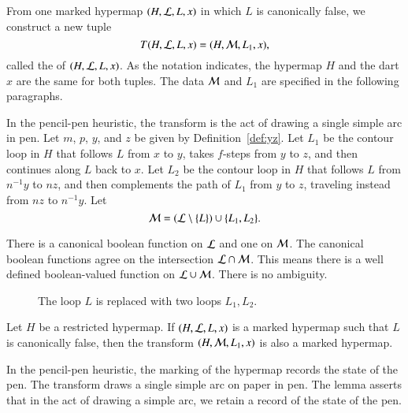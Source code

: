 \begin{definition}[transform]
  From one marked hypermap $(H,{\cal L},L,x)$ in which $L$ is
  canonically false, we construct a new tuple
\[ 
T(H,{\cal L},L,x) = (H,{\cal M},L_1,x),
\] 
 called the  of
  $(H,{\cal{L}},L,x)$.  
As the notation indicates, the hypermap $H$ and the dart $x$ are the same for both
tuples.  The data ${\cal M}$ and $L_1$ are specified in
the following paragraphs.
\end{definition}

In the pencil-pen heuristic, the transform is the act of drawing a single simple arc in
pen.
Let $m$, $p$, $y$, and $z$ be  given by
Definition~\ref{def:yz}.
Let $L_1$ be 
the contour loop in $H$ that follows $L$ from $x$ to $y$,  takes
$f$-steps from $y$ to $z$, and then continues along $L$ back to $x$.  
Let $L_2$ be
the contour loop in $H$ that follows $L$ from $n^{-1} y$ to $n z$, and
then complements the path of $L_1$ from $y$ to $z$, traveling instead
from $n z$ to $n^{-1} y$. 
Let
\[ {\cal M} = ({\cal L}\setminus \{L\}) \cup
\{L_1,L_2\}.\] 

\begin{remark}
There is a canonical boolean function on ${\cal L}$ and one on ${\cal M}$.
The canonical boolean functions agree on the intersection ${\cal L}\cap {\cal M}$.
This means there is a well defined boolean-valued function on 
${\cal L}\cup {\cal M}$.  There is no ambiguity.  
\end{remark}
%




\begin{figure}[htb]
\centering
{}
\caption{The loop $L$ is replaced with two loops $L_1, L_2$.}
\label{fig:L1L2}
\end{figure}



\begin{lemma}\label{lemma:flag} 
Let $H$ be a restricted hypermap.
If $(H,{\cal L},L,x)$ is a marked hypermap such that $L$
is canonically false,  then the transform
$(H,{\cal M},L_1,x)$ 
is also a marked hypermap.
\end{lemma}

In the pencil-pen heuristic, the marking of the hypermap records the
state of the pen.  The transform draws a single simple arc on paper in
pen.  The lemma asserts that in the act of drawing a simple arc, we
retain a record of the state of the pen.

